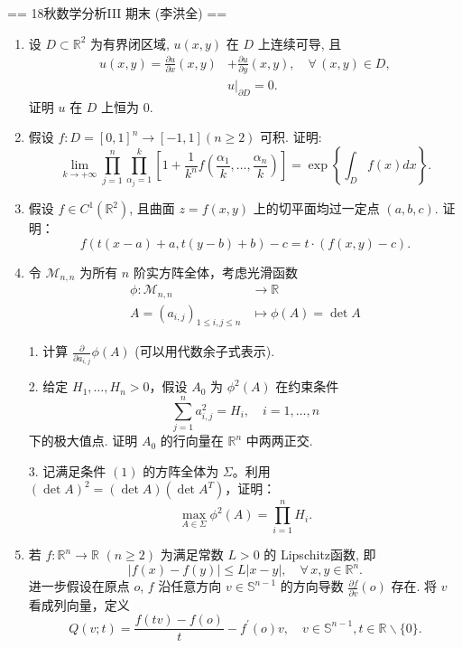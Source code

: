 == 18秋数学分析III 期末 (李洪全) ==
\begin{enumerate}
\item[一、] 设 $D \subset \mathbb{R}^{2}$ 为有界闭区域, $u(x, y)$ 在 $D$ 上连续可导, 且
\begin{align*}
u(x, y)=\frac{\partial u}{\partial x}(x, y)&+\frac{\partial u}{\partial y}(x, y), \quad \forall\, (x, y) \in D, \\
&u|_{\partial D}=0.
\end{align*}
证明 $u$ 在 $D$ 上恒为 $0$.

\item[二、] 假设 $f: D=[0,1]^{n} \longrightarrow[-1,1](n \geq 2)$ 可积. 证明:
$$\lim_{k \rightarrow+\infty} \prod_{j=1}^{n} \prod_{\alpha_{j}=1}^{k}\left[1+\frac{1}{k^{n}} f\left(\frac{\alpha_{1}}{k}, \ldots, \frac{\alpha_{n}}{k}\right)\right]
=\exp \left\{\int_{D} f(x) d x\right\}.$$

\item[三、] 假设 $f \in C^{1}(\mathbb{R}^{2})$, 
且曲面 $z=f(x, y)$ 上的切平面均过一定点 $(a, b, c)$. 证明：
$$f(t(x-a)+a, t(y-b)+b)-c=t \cdot(f(x, y)-c).$$

\item[四、] 令 $\mathcal{M}_{n, n}$ 为所有 $n$ 阶实方阵全体，考虑光滑函数
\begin{align*}
\phi: \mathcal{M}_{n, n} &\longrightarrow \mathbb{R} \\
A=\left(a_{i, j}\right)_{1 \leq i, j \leq n} &\longmapsto \phi(A)=\det A
\end{align*}

1. 计算 $\frac{\partial}{\partial a_{i, j}} \phi(A)$ (可以用代数余子式表示).

2. 给定 $H_{1}, \ldots, H_{n}>0$，假设 $A_{0}$ 为 $\phi^{2}(A)$ 在约束条件
$$\sum_{j=1}^{n} a_{i, j}^{2}=H_{i}, \quad i=1, \ldots, n \tag{1}$$
下的极大值点. 证明 $A_{0}$ 的行向量在 $\mathbb{R}^{n}$ 中两两正交.

3. 记满足条件 $(1)$ 的方阵全体为 $\Sigma$。利用 $(\det A)^{2}=(\det A)\left(\det A^{T}\right)$，证明：
$$\max_{A \in \Sigma} \phi^{2}(A)=\prod_{i=1}^{n} H_{i}.$$

\item[五、] 若 $f: \mathbb{R}^{n} \longrightarrow \mathbb{R}$ $(n \geq 2)$ 为满足常数 $L>0$ 的 Lipschitz函数, 即
$$|f(x)-f(y)| \leq L|x-y|, \quad \forall\, x, y \in \mathbb{R}^{n}.$$
进一步假设在原点 $o$, $f$ 沿任意方向 $v \in \mathbb{S}^{n-1}$ 的方向导数 $\frac{\partial f}{\partial v}(o)$ 存在. 
将 $v$ 看成列向量，定义
$$Q(v ; t)=\frac{f(tv)-f(o)}{t}-f^{\prime}(o) v, \quad v \in \mathbb{S}^{n-1}, t \in \mathbb{R} \backslash\{0\}.$$


\end{enumerate}
